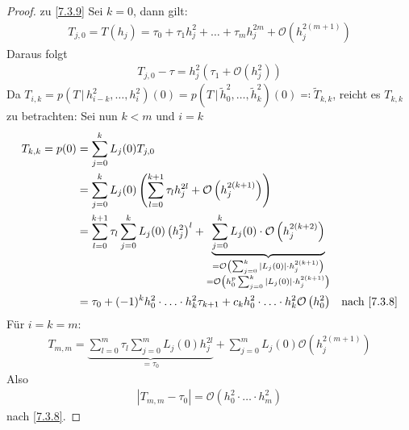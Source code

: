 \documentclass[ngerman,fontsize=11pt, paper=a4, parskip=half, titlepage=true, toc=bib]{scrbook}
\theoremstyle{definition}
\theoremstyle{plain}
\begin{document}
\begin{proof}
  zu \ref{7.3.9}
  Sei $k=0$, dann gilt:
  \begin{gather*}
    T_{j,0} = T(h_j) = \tau_0+\tau_1h_j^2+\ldots+\tau_mh_j^{2m} 
    +\mathcal{O}\left(h_j^{2(m+1)}\right)
  \end{gather*}
  Daraus folgt
  \begin{gather*}
    T_{j,0}-\tau=h_j^2\left(\tau_1+\mathcal{O}( h_j^2)\right)
  \end{gather*}
  Da $T_{i,k}=p(T\,|\,h_{i-k}^2,\ldots,h_i^2)(0)
  =p(T\,|\,\widetilde{h}_0^2,\ldots,\widetilde{h}_k^2)(0)
  \eqqcolon \widetilde{T}_{k,k}$, reicht es $T_{k,k}$ zu betrachten:
  Sei nun $k<m$ und $i=k$
  \begin{align*}
    T_{k,k} = p(0) &= \sum_{j=0}^kL_j(0)T_{j,0} \\
                   &= \sum_{j=0}^kL_j(0)\left(
                     \sum_{l=0}^{k+1}\tau_lh_j^{2l}+\mathcal{O}\left(
                     h_j^{2(k+1)}\right)\right)\\
                   &= \sum_{l=0}^{k+1}\tau_l\sum_{j=0}^kL_j(0)\left(h_j^2\right)^l
                     + \underbrace{\sum_{j=0}^kL_j(0)
                     \cdot \mathcal{O}\left(h_j^{2(k+2)}\right)
                     }_{\substack{
                     =\mathcal{O}\left(
                     \sum_{j=0}^k|L_j(0)|\cdot h_j^{2(k+1)}\right) \\
    =\mathcal{O}\left(h_0^p\sum_{j=0}^k|L_j(0)|\cdot h_j^{2(k+1)}\right)
    }}\\
                   &=\tau_0 + (-1)^kh_0^2\cdot\ldots\cdot
                     h_k^2\tau_{k+1}
                     +c_kh_0^2\cdot\ldots\cdot
                     h_k^2\mathcal{O}\left(h_0^2\right)
                   &\text{nach \ref{7.3.8}}
  \end{align*}
  Für $i=k=m$:
  \begin{gather*}
    T_{m,m}=\underbrace{
      \sum_{l=0}^m\tau_l\sum_{j=0}^m
      L_j(0)h_j^{2l}
    }_{=\tau_0}
    +\sum_{j=0}^m L_j(0)\mathcal{O}\left(h_j^{2(m+1)}\right)
  \end{gather*}
  Also 
  \begin{gather*}
    \left| T_{m,m}-\tau_0\right| = \mathcal{O}\left(h_0^2\cdot
      \ldots\cdot h_m^2\right)
  \end{gather*}
  nach \ref{7.3.8}.
\end{proof}


\nocite{*} %
\backmatter		%


\printindex		%

\printbibliography	%
\end{document}
